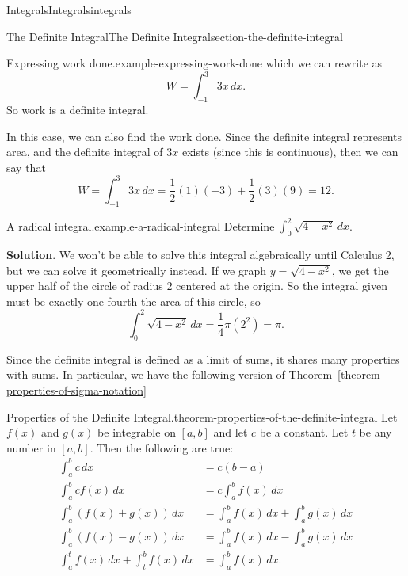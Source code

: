 \documentclass[oneside,10pt,]{book}
\numberwithin{equation}{section}
\begin{document}
\begin{chapterptx}{Integrals}{}{Integrals}{}{}{integrals}
\begin{sectionptx}{The Definite Integral}{}{The Definite Integral}{}{}{section-the-definite-integral}
\begin{example}{Expressing work done.}{example-expressing-work-done}
which we can rewrite as%
\begin{equation*}
W = \int_{-1}^{3}3x\,dx.
\end{equation*}
So work is a definite integral.%
\par
\hypertarget{p-432}{}%
In this case, we can also find the work done. Since the definite integral represents area, and the definite integral of \(3x\) exists (since this is continuous), then we can say that%
\begin{equation*}
W = \int_{-1}^{3}3x\,dx = \frac{1}{2}(1)(-3) + \frac{1}{2}(3)(9) = 12.
\end{equation*}
%
\end{example}
\begin{example}{A radical integral.}{example-a-radical-integral}%
\hypertarget{p-433}{}%
Determine \(\int_{0}^{2}\sqrt{4-x^{2}}\,dx\).%
\par\smallskip%
\noindent\textbf{Solution}.\hypertarget{solution-95}{}\quad%
\hypertarget{p-434}{}%
We won't be able to solve this integral algebraically until Calculus 2, but we can solve it geometrically instead. If we graph \(y = \sqrt{4-x^{2}}\), we get the upper half of the circle of radius \(2\) centered at the origin. So the integral given must be exactly one-fourth the area of this circle, so%
\begin{equation*}
\int_{0}^{2}\sqrt{4-x^{2}}\,dx = \frac{1}{4}\pi(2^{2}) = \pi.
\end{equation*}
%
\end{example}
\hypertarget{p-435}{}%
Since the definite integral is defined as a limit of sums, it shares many properties with sums. In particular, we have the following version of \hyperref[theorem-properties-of-sigma-notation]{Theorem~\ref{theorem-properties-of-sigma-notation}}%
\begin{theorem}{Properties of the Definite Integral.}{}{theorem-properties-of-the-definite-integral}%
\hypertarget{p-436}{}%
Let \(f(x)\) and \(g(x)\) be integrable on \([a,b]\) and let \(c\) be a constant. Let \(t\) be any number in \([a,b]\). Then the following are true:%
\begin{align*}
\int_{a}^{b}c\,dx & = c(b-a) \\
\int_{a}^{b}cf(x)\,dx & = c\int_{a}^{b}f(x)\,dx \\
\int_{a}^{b}(f(x)+g(x))\,dx & = \int_{a}^{b}f(x)\,dx + \int_{a}^{b}g(x)\,dx\\
\int_{a}^{b}(f(x) - g(x))\,dx & = \int_{a}^{b}f(x)\,dx - \int_{a}^{b}g(x)\,dx \\
\int_{a}^{t}f(x)\,dx + \int_{t}^{b}f(x)\,dx & = \int_{a}^{b}f(x)\,dx. 

\end{align*}
\end{theorem}
\end{sectionptx}
\end{chapterptx}
\end{document}
